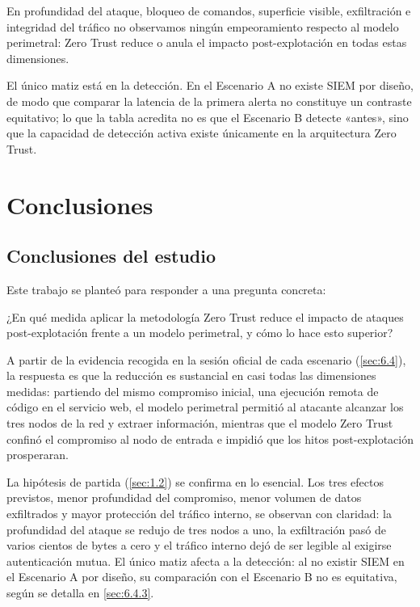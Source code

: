 \documentclass[11pt,spanish,listoffigures,listoftables]{tfgetsinf}
\begin{document}
        En profundidad del ataque, bloqueo de comandos, superficie visible, exfiltración e integridad del tráfico no observamos ningún empeoramiento respecto al modelo perimetral: Zero Trust reduce o anula el impacto post-explotación en todas estas dimensiones. 
        
        El único matiz está en la detección. En el Escenario A no existe SIEM por diseño, de modo que comparar la latencia de la primera alerta no constituye un contraste equitativo; lo que la tabla acredita no es que el Escenario B detecte «antes», sino que la capacidad de detección activa existe únicamente en la arquitectura Zero Trust.


\chapter{Conclusiones}

        \section{Conclusiones del estudio}
        Este trabajo se planteó para responder a una pregunta concreta:

        \begin{tcolorbox}[
            enhanced,
            frame hidden,
            borderline west={3pt}{0pt}{gray!70!black},
            sharp corners
        ]
            ¿En qué medida aplicar la metodología Zero Trust reduce el impacto de ataques post-explotación frente a un modelo perimetral, y cómo lo hace esto superior?
        \end{tcolorbox}

        A partir de la evidencia recogida en la sesión oficial de cada escenario (\cref{sec:6.4}), la respuesta es que la reducción es sustancial en casi todas las dimensiones medidas: partiendo del mismo compromiso inicial, una ejecución remota de código en el servicio web, el modelo perimetral permitió al atacante alcanzar los tres nodos de la red y extraer información, mientras que el modelo Zero Trust confinó el compromiso al nodo de entrada e impidió que los hitos post-explotación prosperaran.

        La hipótesis de partida (\cref{sec:1.2}) se confirma en lo esencial. Los tres efectos previstos, menor profundidad del compromiso, menor volumen de datos exfiltrados y mayor protección del tráfico interno, se observan con claridad: la profundidad del ataque se redujo de tres nodos a uno, la exfiltración pasó de varios cientos de bytes a cero y el tráfico interno dejó de ser legible al exigirse autenticación mutua. El único matiz afecta a la detección: al no existir SIEM en el Escenario A por diseño, su comparación con el Escenario B no es equitativa, según se detalla en \cref{sec:6.4.3}.
\end{document}
